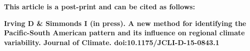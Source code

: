 \textbf{This article is a post-print and can be cited as follows:}    

\textbf{Irving D & Simmonds I (in press). A new method for identifying the Pacific-South American pattern and its influence on regional climate variability. Journal of Climate. doi:10.1175/JCLI-D-15-0843.1}